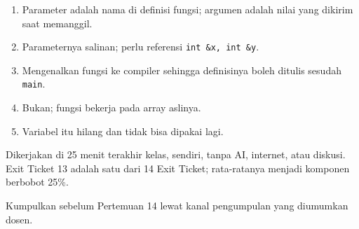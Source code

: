 \documentclass[a4paper]{article}
\begin{document}
\begin{Jawaban}[]
\begin{enumerate}[leftmargin=16pt]
\item Parameter adalah nama di definisi fungsi; argumen adalah nilai yang dikirim saat memanggil.
\item Parameternya salinan; perlu referensi \texttt{int \&x, int \&y}.
\item Mengenalkan fungsi ke compiler sehingga definisinya boleh ditulis sesudah \texttt{main}.
\item Bukan; fungsi bekerja pada array aslinya.
\item Variabel itu hilang dan tidak bisa dipakai lagi.
\end{enumerate}
\end{Jawaban}
Dikerjakan di 25 menit terakhir kelas, sendiri, tanpa AI, internet, atau diskusi. Exit Ticket 13 adalah satu dari 14 Exit Ticket; rata-ratanya menjadi komponen berbobot 25\%.
\par\vspace{4pt}\par\vspace{6pt}
Kumpulkan sebelum Pertemuan 14 lewat kanal pengumpulan yang diumumkan dosen.
\end{document}
